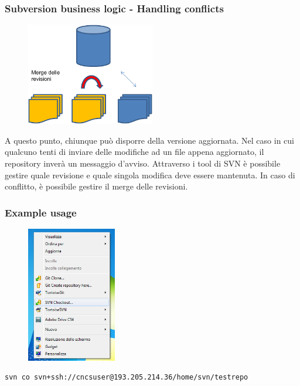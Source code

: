 \documentclass[10pt]{beamer}
\begin{document}
\begin{frame}[fragile]
\frametitle{Subversion business logic - Handling conflicts}
\begin{figure}[h]
 \centering
 \includegraphics[width=0.5\textwidth]{images/svn-step4.png}
\end{figure}
A questo punto, chiunque può disporre della versione aggiornata. Nel caso in cui qualcuno tenti di inviare delle modifiche ad un file appena aggiornato, il repository inverà un messaggio d’avviso.
Attraverso i tool di SVN è possibile gestire quale revisione e quale singola modifica deve essere mantenuta.
In caso di conflitto, è possibile gestire il merge delle revisioni.
\end{frame}


\begin{frame}[fragile]
\frametitle{Example usage}
\begin{figure}[h]
 \centering
 \includegraphics[width=0.35\textwidth]{images/image1.png}
\end{figure}
\begin{verbatim}
svn co svn+ssh://cncsuser@193.205.214.36/home/svn/testrepo 
\end{verbatim}
\end{frame}
\end{document}
